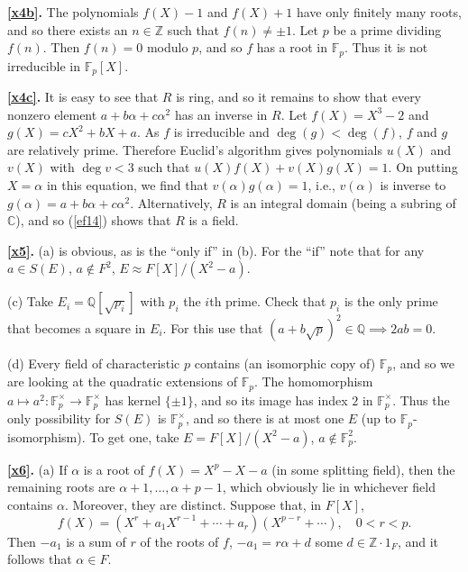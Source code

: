 \documentclass[a4paper,11pt,final,openany]{memoir}
\theoremstyle{nonumberplain}
\begin{document}
\medskip\noindent\textbf{\ref{x4b}.} The polynomials $f(X)-1$ and $f(X)+1$
have only finitely many roots, and so there exists an $n\in\mathbb{Z}{}$ such
that $f(n)\neq\pm1$. Let $p$ be a prime dividing $f(n)$. Then $f(n)=0$ modulo
$p$, and so $f$ has a root in $\mathbb{F}{}_{p}$. Thus it is not irreducible
in $\mathbb{F}{}_{p}[X]$.

\medskip\noindent\textbf{\ref{x4c}.} It is easy to see that $R$ is ring, and
so it remains to show that every nonzero element $a+b\alpha+c\alpha^{2}$ has
an inverse in $R$. Let $f(X)=X^{3}-2$ and $g(X)=cX^{2}+bX+a$. As $f$ is
irreducible and $\deg(g)<\deg(f)$, $f$ and $g$ are relatively prime. Therefore
Euclid's algorithm gives polynomials $u(X)$ and $v(X)$ with $\deg v<3$ such
that $u(X)f(X)+v(X)g(X)=1$. On putting $X=\alpha$ in this equation, we find
that $v(\alpha)g(\alpha)=1$, i.e., $v(\alpha)$ is inverse to $g(\alpha
)=a+b\alpha+c\alpha^{2}$. Alternatively, $R$ is an integral domain (being a
subring of $\mathbb{C}{}$), and so (\ref{ef14}) shows that $R$ is a field.

\medskip\noindent\textbf{\ref{x5}.} (a) is obvious, as is the ``only if'' in
(b). For the ``if'' note that for any $a\in S(E)$, $a\notin F^{2}$, $E\approx
F[X]/(X^{2} -a)$.

(c) Take $E_{i}={\mathbb{Q}}[\sqrt{p_{i}}]$ with $p_{i}$ the $i$th prime.
Check that $p_{i}$ is the only prime that becomes a square in $E_{i}$. For
this use that $(a+b\sqrt p)^{2}\in{\mathbb{Q}}\implies2ab=0$.

(d) Every field of characteristic $p$ contains (an isomorphic copy of)
$\mathbb{F}_{p}$, and so we are looking at the quadratic extensions of
$\mathbb{F}_{p}$. The homomorphism $a\mapsto a^{2}\colon\mathbb{F}_{p}%
^{\times}\rightarrow\mathbb{F}_{p}^{\times}$ has kernel $\{\pm1\}$, and so its
image has index $2$ in $\mathbb{F}_{p}^{\times}$. Thus the only possibility
for $S(E)$ is $\mathbb{F}_{p}^{\times}$, and so there is at most one $E$ (up
to $\mathbb{F}_{p}$-isomorphism). To get one, take $E=F[X]/(X^{2}-a)$,
$a\notin\mathbb{F}_{p}^{2}$.

\medskip\noindent\textbf{\ref{x6}.} (a) If $\alpha$ is a root of
$f(X)=X^{p}-X-a$ (in some splitting field), then the remaining roots are
$\alpha+1,\ldots,\alpha+p-1$, which obviously lie in whichever field contains
$\alpha$. Moreover, they are distinct. Suppose that, in $F[X]$,
\[
f(X)=(X^{r}+a_{1}X^{r-1}+\cdots+a_{r})(X^{p-r}+\cdots),\quad0<r<p.
\]
Then $-a_{1}$ is a sum of $r$ of the roots of $f$, $-a_{1}=r\alpha+d$ some
$d\in\mathbb{Z}\cdot1_{F}$, and it follows that $\alpha\in F$.
\end{document}
